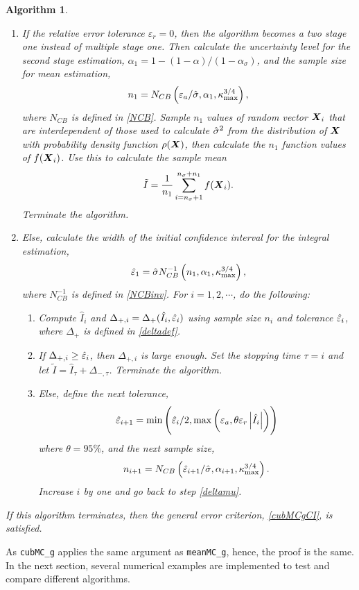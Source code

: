 \documentclass{iitthesis}
\newtheorem{algorithm}[theorem]{Algorithm}
\theoremstyle{definition}
\begin{document}
\begin{algorithm}
\begin{enumerate}
\item If the relative error tolerance $\varepsilon_r=0$, then the algorithm becomes a two stage one instead of multiple stage one. Then calculate the uncertainty level for the second stage estimation, $\alpha_1 = 1-(1-\alpha)/(1-\alpha_\sigma)$, and the sample size for mean estimation, $$n_1 = N_{CB}\left(\varepsilon_a/\hat{\sigma},\alpha_1,\kappa_{\max}^{3/4}\right),$$where $N_{CB}$ is defined in \eqref{NCB}. Sample $n_1$ values of random vector $\boldsymbol{X}_i$ that are interdependent of those used to calculate $\hat{\sigma}^2$ from the distribution of $\boldsymbol{X}$ with probability density function $\rho(\boldsymbol{X})$, then calculate the $n_1$ function values of $f(\boldsymbol{X}_i)$. Use this to calculate the sample mean 
\begin{align}\label{hatIcubMCg}
\tilde{I}= \frac{1}{n_1}\sum_{i = n_\sigma+1}^{n_\sigma+n_1}f(\boldsymbol{X}_i).
\end{align}
Terminate the algorithm.
\item Else, calculate the width of the initial confidence interval for the integral estimation,
\begin{align}
\hat{\varepsilon}_1=\hat{\sigma} N_{CB}^{-1}\left(n_1,\alpha_1,\kappa_{\max}^{3/4}\right),
\end{align}
where $N_{CB}^{-1}$ is defined in \eqref{NCBinv}. For $i = 1,2,\cdots$, do the following:
\begin{enumerate}
\item  \label{deltamucubMCg}Compute $\hat{I}_i$ and $\Delta_{+,i}=\Delta_{+}(\hat{I}_i,\hat{\varepsilon}_i)$ using sample size $n_i$ and tolerance $\hat{\varepsilon}_i$, where $\Delta_{+}$ is defined in \eqref{deltadef}.
\item If $\Delta_{+,i} \geq  \hat{\varepsilon}_i$, then $\Delta_{+,i}$ is large enough. Set the stopping time $\tau = i$ and let $\tilde{I} = \hat{I}_{\tau}+\Delta_{-, \tau}$. Terminate the algorithm.
\item Else, define the next tolerance, $$\hat{\varepsilon}_{i+1} = \min\left(\hat{\varepsilon}_i/2, \max\left(\varepsilon_a,\theta\varepsilon_r\left \lvert \hat{I}_i \right \rvert\right)\right)$$ where $\theta=95\%$, and the next sample size, $$n_{i+1} = N_{CB}\left(\hat{\varepsilon}_{i+1}/\hat{\sigma},\alpha_{i+1},\kappa_{\max}^{3/4}\right).$$ Increase $i$ by one and go back to step \ref{deltamu}. 
\end{enumerate}
\end{enumerate}
If this algorithm terminates, then the general error criterion, \eqref{cubMCgCI}, is satisfied.
\end{algorithm}
As {\tt cubMC\_g} applies the same argument as {\tt meanMC\_g}, hence, the proof is the same. In the next section, several numerical examples are implemented to test and compare different algorithms.
\end{document}
